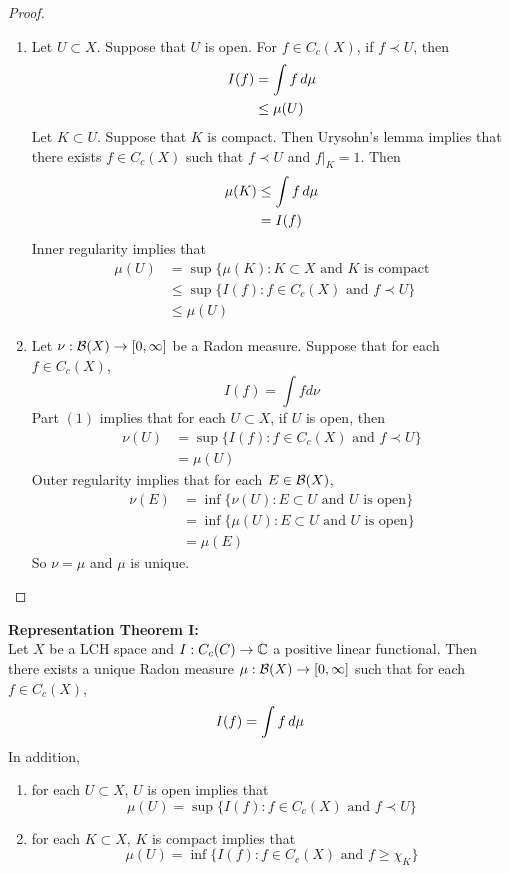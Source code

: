 \documentclass{book}
\begin{document}
	\begin{proof}\
	\begin{enumerate}
	\item Let $U \subset X$. Suppose that $U$ is open. For $f \in C_c(X)$, if $f \prec U$, then 
	\begin{align*}
	I(f) 
	&= \int f \, d \mu \\
	& \leq \mu(U) 
	\end{align*}
	Let $K \subset U$. Suppose that $K$ is compact. Then Urysohn's lemma implies that there exists $f \in C_c(X)$ such that $f \prec U$ and $f|_K = 1$. Then 
	\begin{align*}
	\mu(K) 
	&\leq \int f \, d \mu \\
	&= I(f)
	\end{align*}
	Inner regularity implies that 
	\begin{align*}
	\mu(U) 
	&= \sup \{\mu(K): K \subset X \text{ and $K$ is compact} \\
	& \leq \sup \{I(f): f \in C_c(X) \text{ and } f \prec U \} \\
	&\leq \mu(U)
	\end{align*}
	\item Let $\nu: \mathcal{B}(X) \rightarrow [0,\infty]$ be a Radon measure. Suppose that for each $f \in C_c(X)$, $$I(f) = \int f d\nu$$
	Part $(1)$ implies that for each $U \subset X$, if $U$ is open, then 
	\begin{align*}
	\nu(U) 
	&= \sup \{I(f): f \in C_c(X) \text{ and } f \prec U \} \\
	&= \mu(U)
\end{align*}		
	Outer regularity implies that for each $E \in \mathcal{B}(X)$, 
	\begin{align*}
	\nu(E) 
	&= \inf \{\nu(U): E \subset U \text{ and $U$ is open}\} \\
	&= \inf \{\mu(U): E \subset U \text{ and $U$ is open}\} \\
	&= \mu(E)
	\end{align*}
	So $\nu = \mu$ and $\mu$ is unique.
\end{enumerate}		  
	\end{proof}
	
	\begin{thm}\textbf{Representation Theorem I:}\\
	Let $X$ be a LCH space and $I: C_c(C) \rightarrow \mathbb{C}$ a positive linear functional. Then there exists a unique Radon measure $\mu:\mathcal{B}(X) \rightarrow [0,\infty]$ such that for each $f \in C_c(X)$, $$I(f) = \int f \, d \mu$$ 
	In addition, 
	\begin{enumerate}
	\item for each $U \subset X$, $U$ is open implies that $$\mu(U) = \sup \{I(f): f \in C_c(X) \text{ and } f \prec U \}$$
	\item for each $K \subset X$, $K$ is compact implies that $$\mu(U) = \inf \{I(f): f \in C_c(X) \text{ and } f  \geq \chi_K \}$$
\end{enumerate}	 
	\end{thm}
	
\end{document}
